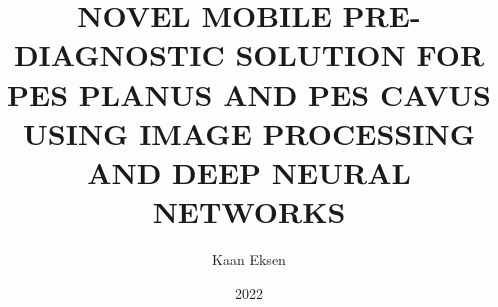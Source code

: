 \documentclass[algpseudocode]{thesis}
\title{NOVEL MOBILE PRE-DIAGNOSTIC SOLUTION FOR PES PLANUS AND PES CAVUS USING IMAGE PROCESSING AND DEEP NEURAL NETWORKS}
\author{Kaan Eksen}
\date{2022}
\begin{document}
\MakeMScThesis























\end{document}
